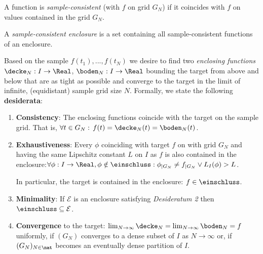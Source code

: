 \begin{defn}
A function is \emph{sample-consistent} (with $f$ on grid $G_N$) if
it coincides with $f$ on values contained in the grid $G_N$.
\end{defn}

\begin{defn}
A \emph{sample-consistent enclosure} is a set containing all
sample-consistent functions of an enclosure.
\end{defn}



Based on the sample $f(t_1),...,f(t_N)$ we desire to find two
\emph{enclosing functions} $\decke_N: I \to \Real$, $\mathfrak
\boden_N: I \to \Real$ bounding the target from above and below that
are as tight as possible and converge to the target in the limit of
infinite, (equidistant) sample grid size $N$. Formally, we state the
following \textbf{desiderata}:
\begin{enumerate} 
    \item \textbf{Consistency}: The enclosing functions coincide with the target on the sample grid. That is,
    $\forall t \in G_N: \, f(t) = \decke_N(t) = \boden_N(t)$.
     \item \textbf{Exhaustiveness}: Every $\phi$ coinciding with target $f$ on with grid $G_N$ and
having the same Lipschitz
    constant $L$ on $I$ as $f$ is also contained in the enclosure:$\forall \phi: I \to \Real, \phi \notin \einschluss:
       \phi_{\vert G_N} \neq f_{\vert
    G_N} \vee L_I(\phi) > L$.
    
    In particular, the target is contained in the enclosure: $f \in \einschluss$.
\item \textbf{Minimality}: If $\mathcal E$ is an enclosure satisfying \emph{Desideratum 2} then $\einschluss \subseteq \mathcal E$.    
    
\item \textbf{Convergence} to the target: $\lim_{N \to \infty} \decke_N = \lim_{N \to \infty}
    \boden_N = f$ uniformly, if $(G_N)$ converges to a dense subset of $I$ as $N \to \infty$ or, if $(G_N)_{N \in \nat}$ becomes an eventually dense partition of $I$.

\end{enumerate}

